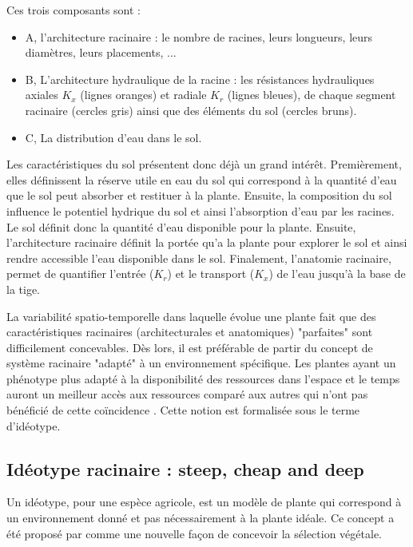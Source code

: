 Ces trois composants sont :

\begin{itemize}
    \item A, l'architecture racinaire : le nombre de racines, leurs longueurs, leurs diamètres, leurs placements, ...
    \item B, L'architecture hydraulique de la racine : les résistances hydrauliques axiales $K_{x}$ (lignes oranges) et radiale $K_{r}$ (lignes bleues), de chaque segment racinaire (cercles gris) ainsi que des éléments du sol (cercles bruns).
    \item C, La distribution d'eau dans le sol.
\end{itemize}

Les caractéristiques du sol présentent donc déjà un grand intérêt.
Premièrement, elles définissent la réserve utile en eau du sol qui correspond à la quantité d’eau que le sol peut absorber et restituer à la plante.
Ensuite, la composition du sol influence le potentiel hydrique du sol et ainsi l'absorption d'eau par les racines.
Le sol définit donc la quantité d'eau disponible pour la plante. 
Ensuite, l'architecture racinaire définit la portée qu'a la plante pour explorer le sol et ainsi rendre accessible l'eau disponible dans le sol.
Finalement, l'anatomie racinaire, permet de quantifier l'entrée ($K_{r}$) et le transport ($K_{x}$) de l'eau jusqu'à la base de la tige.
\newline

La variabilité spatio-temporelle dans laquelle évolue une plante fait que des caractéristiques racinaires (architecturales et anatomiques) "parfaites" sont difficilement concevables.
Dès lors, il est préférable de partir du concept de système racinaire "adapté" à un environnement spécifique.
Les plantes ayant un phénotype plus adapté à la disponibilité des ressources dans l'espace et le temps auront un meilleur accès aux ressources comparé aux autres qui n'ont pas bénéficié de cette coïncidence \citep{lynch_steep_2013}.
Cette notion est formalisée sous le terme d'idéotype.

\subsection{Idéotype racinaire : steep, cheap and deep}

Un idéotype, pour une espèce agricole, est un modèle de plante qui correspond à un environnement donné et pas nécessairement à la plante idéale. 
Ce concept a été proposé par \cite{donald_breeding_1968} comme une nouvelle façon de concevoir la sélection végétale.
\newline 

